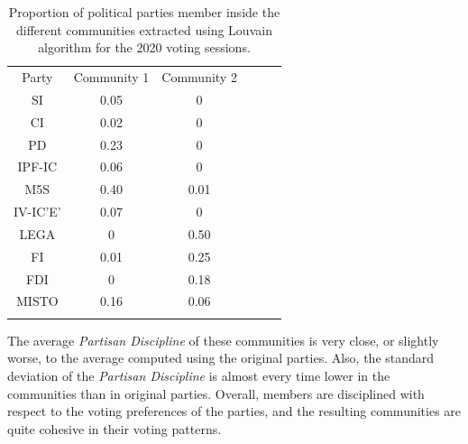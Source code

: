 \begin{table}[h]
\begin{tabular}{ccclll}
\multicolumn{1}{c|}{Party}    & Community 1          & Community 2          &  &  &  \\ \cline{1-3}
\multicolumn{1}{c|}{SI}       & 0.05                 & 0                    &  &  &  \\
\multicolumn{1}{c|}{CI}       & 0.02                 & 0                    &  &  &  \\
\multicolumn{1}{c|}{PD}       & 0.23                 & 0                    &  &  &  \\
\multicolumn{1}{c|}{IPF-IC}   & 0.06                 & 0                    &  &  &  \\
\multicolumn{1}{c|}{M5S}      & 0.40                 & 0.01                 &  &  &  \\
\multicolumn{1}{c|}{IV-IC'E'} & 0.07                 & 0                    &  &  &  \\
\multicolumn{1}{c|}{LEGA}     & 0                    & 0.50                 &  &  &  \\
\multicolumn{1}{c|}{FI}       & 0.01                 & 0.25                 &  &  &  \\
\multicolumn{1}{c|}{FDI}      & 0                    & 0.18                 &  &  &  \\
\multicolumn{1}{c|}{MISTO}    & 0.16                 & 0.06                 &  &  &  \\
\multicolumn{1}{l}{}          & \multicolumn{1}{l}{} & \multicolumn{1}{l}{} &  &  & 
\end{tabular}
\caption{Proportion of political parties member inside the different communities extracted using Louvain algorithm for the 2020 voting sessions.}
\label{tab:community_party}
\end{table}

The average \textit{Partisan Discipline} of these communities is very close, or slightly worse, to the average computed using the original parties. Also, the standard deviation of the \textit{Partisan Discipline} is almost every time lower in the communities than in original parties. Overall, members are disciplined with respect to the voting preferences of the parties, and the resulting communities are quite cohesive in their voting patterns. \\

